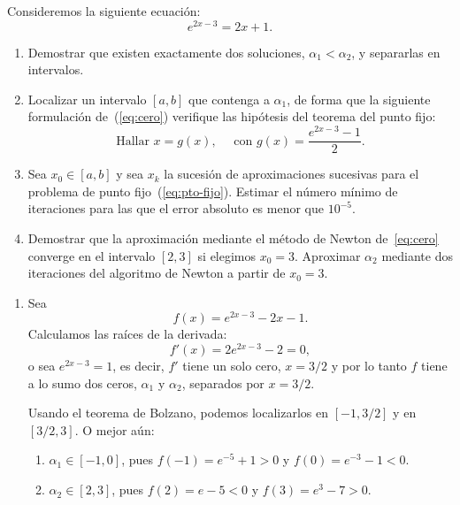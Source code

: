 \begin{EjerciciosResueltos}

  \begin{problema}
    Consideremos la siguiente ecuación:
    \begin{equation}
      \label{eq:cero}
      e^{2x-3} = 2x+1.
    \end{equation}

    \begin{enumerate}
    \item Demostrar que existen exactamente dos soluciones,
      $\alpha_1<\alpha_2$, y separarlas en intervalos.

    \item Localizar un intervalo $[a,b]$ que contenga a $\alpha_1$,
      de forma que la siguiente formulación de~(\ref{eq:cero})
      verifique las hipótesis del teorema del punto fijo:
      \begin{equation}
        \label{eq:pto-fijo}
        \text{Hallar } x=g(x), \quad \text{ con } g(x)=\frac{e^{2x-3}-1}2.
      \end{equation}

    \item Sea $x_0\in [a,b]$ y sea $x_k$  la sucesión de
      aproximaciones sucesivas para el problema de punto
      fijo~(\ref{eq:pto-fijo}). Estimar el número mínimo de
      iteraciones para las que el error absoluto es menor que
      $10^{-5}$.

    \item Demostrar que la aproximación mediante el método de Newton
      de~\eqref{eq:cero} converge en el intervalo $[2,3]$ si elegimos
      $x_0=3$.
      Aproximar $\alpha_2$ mediante dos iteraciones del algoritmo de
      Newton a partir de $x_0=3$.
    \end{enumerate}
  \end{problema}

  \begin{solucion}
    \begin{enumerate}

    \item
      Sea $$f(x)=e^{2x-3} - 2x-1.$$ Calculamos las raíces de la
      derivada:
      $$
      f'(x)=2e^{2x-3}-2=0,
      $$
      o sea $e^{2x-3}=1$, es decir, $f'$ tiene un solo cero, $x=3/2$
      y por lo tanto $f$ tiene a lo sumo dos ceros, $\alpha_1$ y
      $\alpha_2$, separados por $x=3/2$.

      Usando el teorema de Bolzano, podemos localizarlos en
      $[-1,3/2]$ y en $[3/2,3]$. O mejor aún:
      \begin{enumerate}
      \item $\alpha_1\in [-1,0]$, pues $f(-1)=e^{-5}+1>0$ y
        $f(0)=e^{-3}-1<0$.
      \item $\alpha_2\in [2,3]$, pues $f(2)=e-5<0$ y
        $f(3)=e^{3}-7 > 0$.
      \end{enumerate}


\end{enumerate}
\end{solucion}
\end{EjerciciosResueltos}
